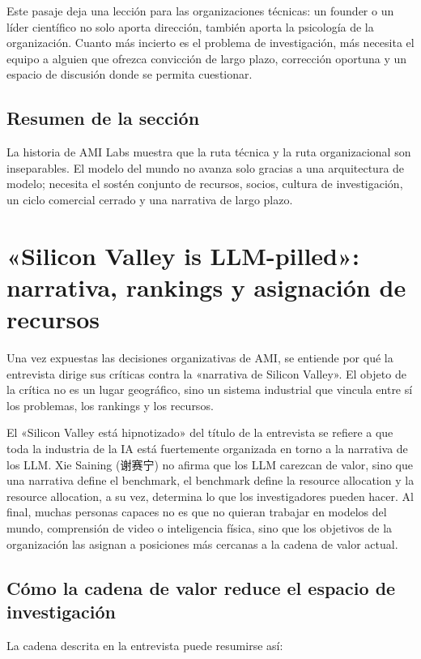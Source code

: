\documentclass[a4paper]{article}
\begin{document}
Este pasaje deja una lección para las organizaciones técnicas: un founder o un líder científico no solo aporta dirección, también aporta la psicología de la organización. Cuanto más incierto es el problema de investigación, más necesita el equipo a alguien que ofrezca convicción de largo plazo, corrección oportuna y un espacio de discusión donde se permita cuestionar.

\subsection{Resumen de la sección}

La historia de AMI Labs muestra que la ruta técnica y la ruta organizacional son inseparables. El modelo del mundo no avanza solo gracias a una arquitectura de modelo; necesita el sostén conjunto de recursos, socios, cultura de investigación, un ciclo comercial cerrado y una narrativa de largo plazo.
\section{«Silicon Valley is LLM-pilled»: narrativa, rankings y asignación de recursos}

Una vez expuestas las decisiones organizativas de AMI, se entiende por qué la entrevista dirige sus críticas contra la «narrativa de Silicon Valley». El objeto de la crítica no es un lugar geográfico, sino un sistema industrial que vincula entre sí los problemas, los rankings y los recursos.

El «Silicon Valley está hipnotizado» del título de la entrevista se refiere a que toda la industria de la IA está fuertemente organizada en torno a la narrativa de los LLM. Xie Saining (谢赛宁) no afirma que los LLM carezcan de valor, sino que una narrativa define el benchmark, el benchmark define la resource allocation y la resource allocation, a su vez, determina lo que los investigadores pueden hacer. Al final, muchas personas capaces no es que no quieran trabajar en modelos del mundo, comprensión de video o inteligencia física, sino que los objetivos de la organización las asignan a posiciones más cercanas a la cadena de valor actual.

\subsection{Cómo la cadena de valor reduce el espacio de investigación}

La cadena descrita en la entrevista puede resumirse así:
\end{document}
